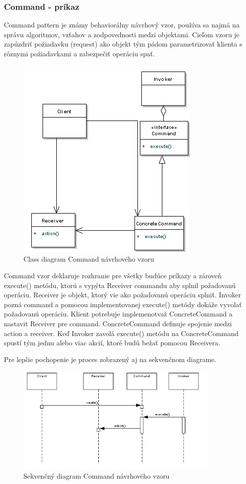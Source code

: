 {\subsubsection{Command - príkaz}
\indent Command pattern je známy behaviorálny návrhový vzor, používa sa najmä na správu algoritmov, vzťahov a zodpovednosti medzi objektami. 
Cieľom vzoru je zapúzdriť požiadavku (request) ako objekt tým pádom parametrizovať klienta s rôznymi požiadavkami a zabezpečiť operáciu spať.\cite{designpattern}
\begin{figure}[H]
	\centering
	\includegraphics[width=9cm]{img/command_pattern_class.jpg}
	\caption{Class diagram Command návrhového vzoru}
	\label{fig:test}
\end{figure}

Command vzor deklaruje rozhranie pre všetky budúce príkazy a zároveň execute() metódu, ktorú s vypýta Receiver commandu aby splnil požadovanú operáciu.
Receiver je objekt, ktorý vie ako požadovanú operáciu splniť. Invoker pozná command a pomocou implementovanej execute() metódy dokáže vyvolať požadovanú operáciu.
Klient potrebuje implemenotvaž ConcreteCommand a nastavit Receiver pre command. ConcreteCommand definuje spojenie medzi action a receiver. Keď Invoker zavolá execute() metódu na ConcreteCommand spustí tým jednu alebo viac akcií, ktoré budú bežať pomocou Receivera.\cite{designpattern}

Pre lepšie pochopenie je proces zobrazený aj na sekvenčnom diagrame.
\begin{figure}[H]
	\centering
	\includegraphics[width=10cm]{img/command_seq.jpg}
	\caption{Sekvenčný diagram Command návrhového vzoru}
	\label{fig:test}
\end{figure}
}
